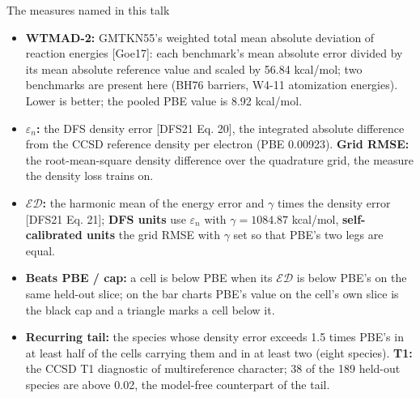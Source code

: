 \begin{frame}{The measures named in this talk}
  \small
  \begin{itemize}
    \item \textbf{WTMAD-2:} GMTKN55's weighted total mean absolute deviation of reaction energies [Goe17]: each benchmark's mean absolute error divided by its mean absolute reference value and scaled by 56.84 kcal/mol; two benchmarks are present here (BH76 barriers, W4-11 atomization energies). Lower is better; the pooled PBE value is 8.92 kcal/mol.
    \item \textbf{$\varepsilon_n$:} the DFS density error [DFS21 Eq. 20], the integrated absolute difference from the CCSD reference density per electron (PBE 0.00923). \textbf{Grid RMSE:} the root-mean-square density difference over the quadrature grid, the measure the density loss trains on.
    \item \textbf{$\mathcal{ED}$:} the harmonic mean of the energy error and $\gamma$ times the density error [DFS21 Eq. 21]; \textbf{DFS units} use $\varepsilon_n$ with $\gamma = 1084.87$ kcal/mol, \textbf{self-calibrated units} the grid RMSE with $\gamma$ set so that PBE's two legs are equal.
    \item \textbf{Beats PBE / cap:} a cell is below PBE when its $\mathcal{ED}$ is below PBE's on the same held-out slice; on the bar charts PBE's value on the cell's own slice is the black cap and a triangle marks a cell below it.
    \item \textbf{Recurring tail:} the species whose density error exceeds 1.5 times PBE's in at least half of the cells carrying them and in at least two (eight species). \textbf{T1:} the CCSD T1 diagnostic of multireference character; 38 of the 189 held-out species are above 0.02, the model-free counterpart of the tail.
  \end{itemize}
\end{frame}
